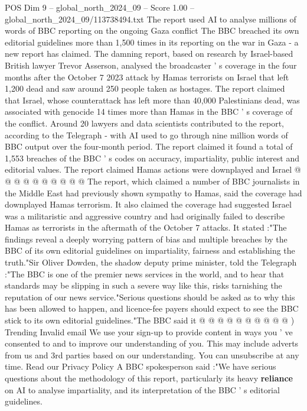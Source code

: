 \begin{textsample}{POS Dim 9 – global\_north\_2024\_09 – Score 1.00 – global\_north\_2024\_09/113738494.txt}  \label{ex:f9_pos_432}
The report used AI to analyse millions of words of BBC reporting on the ongoing Gaza conflict The BBC breached its own editorial guidelines more than 1,500 times in its reporting on the war in Gaza - a new report has claimed.
The damning report, based on research by Israel-based British lawyer Trevor Asserson, analysed the broadcaster ' s coverage in the four months after the October 7 2023 attack by Hamas terrorists on Israel that left 1,200 dead and saw around 250 people taken as hostages.
The report claimed that Israel, whose counterattack has left more than 40,000 Palestinians dead, was associated with genocide 14 times more than Hamas in the BBC ' s coverage of the conflict.
Around 20 lawyers and data scientists contributed to the report, according to the Telegraph - with AI used to go through nine million words of BBC output over the four-month period.
The report claimed it found a total of 1,553 breaches of the BBC ' s codes on accuracy, impartiality, public interest and editorial values.
The report claimed Hamas actions were downplayed and Israel @ @ @ @ @ @ @ @ @ @ The report, which claimed a number of BBC journalists in the Middle East had previously shown sympathy to Hamas, said the coverage had downplayed Hamas terrorism.
It also claimed the coverage had suggested Israel was a militaristic and aggressive country and had originally failed to describe Hamas as terrorists in the aftermath of the October 7 attacks.
It stated :"The findings reveal a deeply worrying pattern of bias and multiple breaches by the BBC of its own editorial guidelines on impartiality, fairness and establishing the truth."Sir Oliver Dowden, the shadow deputy prime minister, told the Telegraph :"The BBC is one of the premier news services in the world, and to hear that standards may be slipping in such a severe way like this, risks tarnishing the reputation of our news service."Serious questions should be asked as to why this has been allowed to happen, and licence-fee payers should expect to see the BBC stick to its own editorial guidelines."The BBC said it @ @ @ @ @ @ @ @ @ @ ) Trending Invalid email We use your sign-up to provide content in ways you ' ve consented to and to improve our understanding of you.
This may include adverts from us and 3rd parties based on our understanding.
You can unsubscribe at any time.
Read our Privacy Policy A BBC spokesperson said :"We have serious questions about the methodology of this report, particularly its heavy \textbf{reliance} on AI to analyse impartiality, and its interpretation of the BBC ' s editorial guidelines.

\end{textsample}
